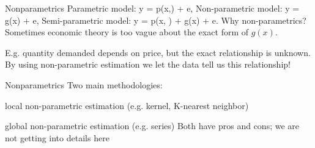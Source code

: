 %	

\begin{frame}{Nonparametrics}
	Parametric model:
	\be
		y = p(x,\beta) + e,\quad {}
	\ee
	Non-parametric model:
	\be
		y = g(x) + e, \quad {}
	\ee
	Semi-parametric model:
	\be
		y = p(x, \beta) + g(x) + e.
	\ee
	Why non-parametrics? Sometimes economic theory is too vague about the exact form of $g(x)$.
	
	E.g. quantity demanded depends on price, but the exact relationship is unknown. By using non-parametric estimation we let the data tell us this relationship!
\end{frame}

\begin{frame}{Nonparametrics}
	Two main methodologies: 
	\bi
		\item{local non-parametric estimation (e.g. kernel, K-nearest neighbor)}
		\item{global non-parametric estimation (e.g. series)}
	\ei
	Both have pros and cons; we are not getting into details here
\end{frame}

